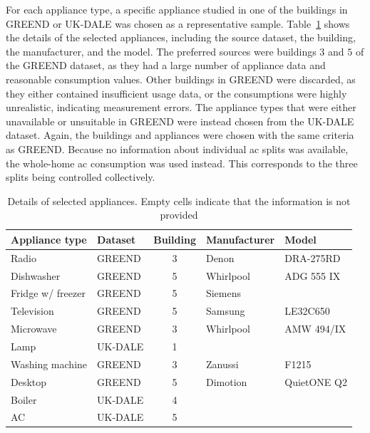 For each appliance type, a specific appliance studied in one of the buildings in GREEND or UK-DALE was chosen as a representative sample. Table~\ref{tab:appliances_details} shows the details of the selected appliances, including the source dataset, the building, the manufacturer, and the model. The preferred sources were buildings $3$ and $5$ of the GREEND dataset, as they had a large number of appliance data and reasonable consumption values. Other buildings in GREEND were discarded, as they either contained insufficient usage data, or the consumptions were highly unrealistic, indicating measurement errors. The appliance types that were either unavailable or unsuitable in GREEND were instead chosen from the UK-DALE dataset. Again, the buildings and appliances were chosen with the same criteria as GREEND. Because no information about individual \acrshort{ac} splits was available, the whole-home \acrshort{ac} consumption was used instead. This corresponds to the three splits being controlled collectively.

\begin{table}
  \centering
  \begin{tabular}{llcll}
    \hline
    \textbf{Appliance type} & \textbf{Dataset} & \textbf{Building} & \textbf{Manufacturer} & \textbf{Model} \\ \hline
    Radio                   & GREEND           & 3                 & Denon                 & DRA-275RD      \\
    Dishwasher              & GREEND           & 5                 & Whirlpool             & ADG 555 IX     \\
    Fridge w/ freezer       & GREEND           & 5                 & Siemens               &                \\
    Television              & GREEND           & 5                 & Samsung               & LE32C650       \\
    Microwave               & GREEND           & 3                 & Whirlpool             & AMW 494/IX     \\
    Lamp                    & UK-DALE          & 1                 &                       &                \\
    Washing machine         & GREEND           & 3                 & Zanussi               & F1215          \\
    Desktop                 & GREEND           & 5                 & Dimotion              & QuietONE Q2    \\
    Boiler                  & UK-DALE          & 4                 &                       &                \\
    AC                      & UK-DALE          & 5                 &                       &                \\ \hline
  \end{tabular}%
  \caption[Details of selected appliances]{Details of selected appliances. Empty cells indicate that the information is not provided}
  \label{tab:appliances_details}
\end{table}

